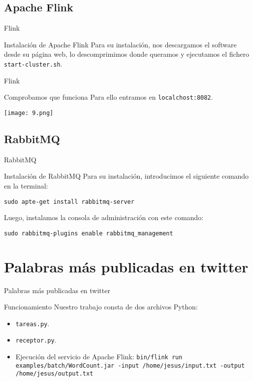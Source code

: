 \documentclass{beamer}
\begin{document}
\subsection{Apache Flink}
\begin{frame}{Flink}
	\begin{block}{Instalación de Apache Flink}
		Para su instalación, nos descargamos el software desde su página web, lo descomprimimos donde queramos y ejecutamos el fichero \texttt{start-cluster.sh}.
	\end{block}
\end{frame}

\begin{frame}{Flink}
\begin{block}{Comprobamos que funciona}
	Para ello entramos en \texttt{localchost:8082}.
	\begin{center}
		\texttt{[image: 9.png]}
	\end{center}
\end{block}
\end{frame}

\subsection{RabbitMQ}
\begin{frame}{RabbitMQ}
	\begin{block}{Instalación de RabbitMQ}
		Para su instalación, introducimos el siguiente comando en la terminal:
		\begin{center}
			\texttt{sudo apte-get install rabbitmq-server}
		\end{center}
		Luego, instalamos la consola de administración con este comando:
		\begin{center}
			\texttt{sudo rabbitmq-plugins enable rabbitmq\_management}
		\end{center}
	\end{block}
\end{frame}

\section{Palabras más publicadas en twitter}
\begin{frame}{Palabras más publicadas en twitter}
\begin{block}{Funcionamiento}
	Nuestro trabajo consta de dos archivos Python:
	\begin{itemize}
		\item \texttt{tareas.py}.
		\item \texttt{receptor.py}.
		\item Ejecución del servicio de Apache Flink: \texttt{bin/flink run examples/batch/WordCount.jar -input /home/jesus/input.txt -output /home/jesus/output.txt}
	\end{itemize}
\end{block}	
\end{frame}
\end{document}
